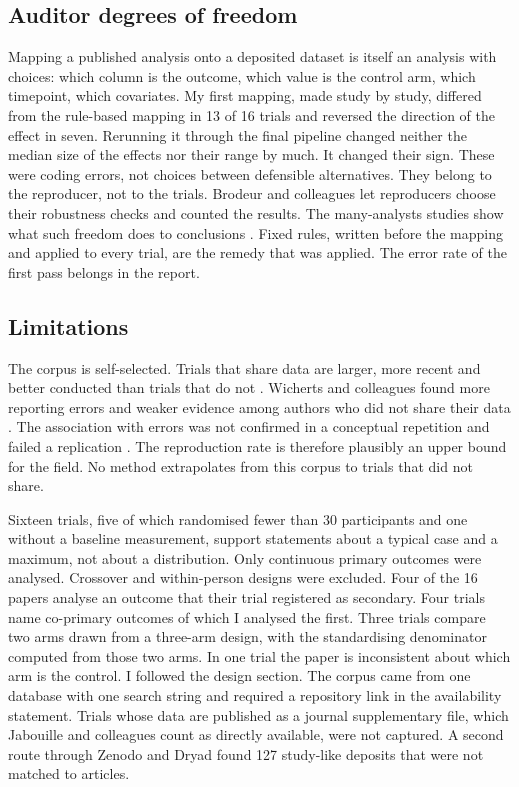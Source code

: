\subsection{Auditor degrees of freedom}\label{auditor-degrees-of-freedom}

Mapping a published analysis onto a deposited dataset is itself an analysis with choices: which column is the outcome, which value is the control arm, which timepoint, which covariates. My first mapping, made study by study, differed from the rule-based mapping in 13 of 16 trials and reversed the direction of the effect in seven. Rerunning it through the final pipeline changed neither the median size of the effects nor their range by much. It changed their sign. These were coding errors, not choices between defensible alternatives. They belong to the reproducer, not to the trials. Brodeur and colleagues let reproducers choose their robustness checks and counted the results. The many-analysts studies show what such freedom does to conclusions \cite{Silberzahn_2018,Breznau_2022}. Fixed rules, written before the mapping and applied to every trial, are the remedy that was applied. The error rate of the first pass belongs in the report.

\subsection{Limitations}\label{limitations}

The corpus is self-selected. Trials that share data are larger, more recent and better conducted than trials that do not \cite{Tsujimoto_2020}. Wicherts and colleagues found more reporting errors and weaker evidence among authors who did not share their data \cite{Wicherts_2011}. The association with errors was not confirmed in a conceptual repetition \cite{Nuijten_2017} and failed a replication \cite{Claesen_2023}. The reproduction rate is therefore plausibly an upper bound for the field. No method extrapolates from this corpus to trials that did not share.

Sixteen trials, five of which randomised fewer than 30 participants and one without a baseline measurement, support statements about a typical case and a maximum, not about a distribution. Only continuous primary outcomes were analysed. Crossover and within-person designs were excluded. Four of the 16 papers analyse an outcome that their trial registered as secondary. Four trials name co-primary outcomes of which I analysed the first. Three trials compare two arms drawn from a three-arm design, with the standardising denominator computed from those two arms. In one trial the paper is inconsistent about which arm is the control. I followed the design section. The corpus came from one database with one search string and required a repository link in the availability statement. Trials whose data are published as a journal supplementary file, which Jabouille and colleagues count as directly available, were not captured. A second route through Zenodo and Dryad found 127 study-like deposits that were not matched to articles.

